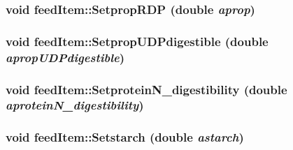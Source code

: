 \label{classfeed_item_a402e160cb67531d01d55621e7fab8c9b}
\hypertarget{classfeed_item_a2d4b61ce89e7e04f22c4454a63c0ed40}{
\subsubsection[{SetpropRDP}]{\setlength{\rightskip}{0pt plus 5cm}void feedItem::SetpropRDP (double {\em aprop})}}
\label{classfeed_item_a2d4b61ce89e7e04f22c4454a63c0ed40}
\hypertarget{classfeed_item_ab36494c4378cdf496b70c9e92a5aeb40}{
\subsubsection[{SetpropUDPdigestible}]{\setlength{\rightskip}{0pt plus 5cm}void feedItem::SetpropUDPdigestible (double {\em apropUDPdigestible})}}
\label{classfeed_item_ab36494c4378cdf496b70c9e92a5aeb40}
\hypertarget{classfeed_item_a6cea7c9bd1b2134a9714675e01b0c9f8}{
\subsubsection[{SetproteinN\_\-digestibility}]{\setlength{\rightskip}{0pt plus 5cm}void feedItem::SetproteinN\_\-digestibility (double {\em aproteinN\_\-digestibility})}}
\label{classfeed_item_a6cea7c9bd1b2134a9714675e01b0c9f8}
\hypertarget{classfeed_item_aa8bab3d84660829128f91b2ae3dd0b80}{
\subsubsection[{Setstarch}]{\setlength{\rightskip}{0pt plus 5cm}void feedItem::Setstarch (double {\em astarch})}}
\label{classfeed_item_aa8bab3d84660829128f91b2ae3dd0b80}
